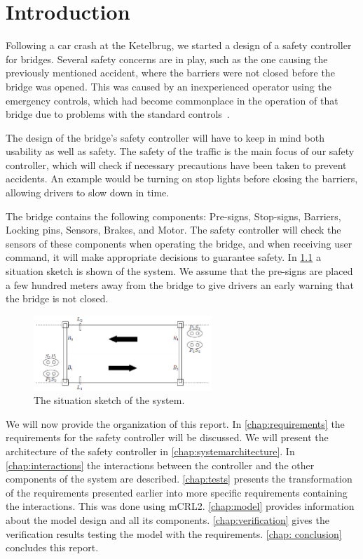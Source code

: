 \chapter{Introduction}

	Following a car crash at the Ketelbrug, we started a design of a safety controller for bridges.
	Several safety concerns are in play, such as the one causing the previously mentioned accident, where the barriers were not closed before the bridge was opened.
	This was caused by an inexperienced operator using the emergency controls,
	which had become commonplace in the operation of that bridge due to problems with the standard controls~\cite{ProjectGuide}.
	
	The design of the bridge's safety controller will have to keep in mind both usability as well as safety.
	The safety of the traffic is the main focus of our safety controller,
	which will check if necessary precautions have been taken to prevent accidents.
	An example would be turning on stop lights before closing the barriers, allowing drivers to slow down in time.
	
	The bridge contains the following components: Pre-signs, Stop-signs, Barriers, Locking pins, Sensors, Brakes, and Motor.
	The safety controller will check the sensors of these components when operating the bridge, and when receiving user command, it will make appropriate decisions to guarantee safety. 
	In \cref{fig:situation} a situation sketch is shown of the system. 
	We assume that the pre-signs are placed a few hundred meters away from the bridge to give drivers an early warning that the bridge is not closed.
	
	\begin{figure}[!htbp]
		\begin{center}
		\includegraphics[width=0.6\textwidth]{images/Situation.png}
		\caption{The situation sketch of the system. ~\cite{ProjectGuide}}
		\label{fig:situation}
		\end{center}
	\end{figure}
	
	
	We will now provide the organization of this report. 
	In \cref{chap:requirements} the requirements for the safety controller will be discussed. 
	We will present the architecture of the safety controller in \cref{chap:systemarchitecture}. 
	In \cref{chap:interactions} the interactions between the controller and the other components of the system are described. 
	\cref{chap:tests} presents the transformation of the requirements presented earlier into more specific requirements containing the interactions. 
	This was done using mCRL2. 
	\cref{chap:model} provides information about the model design and all its components. 
	\cref{chap:verification} gives the verification results testing the model with the requirements.
	\cref{chap: conclusion} concludes this report.
